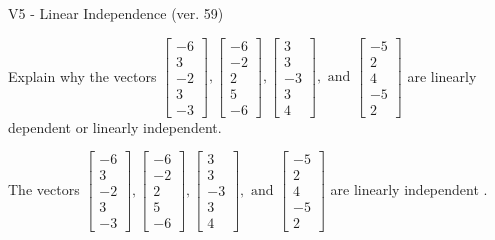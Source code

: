 \begin{exercise}
  \begin{exerciseTitle}V5 - Linear Independence (ver. 59)\end{exerciseTitle}
  \begin{exerciseStatement}
    Explain why the vectors \(\left[\begin{array}{r}
-6 \\
3 \\
-2 \\
3 \\
-3
\end{array}\right] , \left[\begin{array}{r}
-6 \\
-2 \\
2 \\
5 \\
-6
\end{array}\right] , \left[\begin{array}{r}
3 \\
3 \\
-3 \\
3 \\
4
\end{array}\right] , \text{ and } \left[\begin{array}{r}
-5 \\
2 \\
4 \\
-5 \\
2
\end{array}\right]\) are linearly dependent or linearly independent.	


  \end{exerciseStatement}
  \begin{exerciseAnswer}
   The vectors \(\left[\begin{array}{r}
-6 \\
3 \\
-2 \\
3 \\
-3
\end{array}\right] , \left[\begin{array}{r}
-6 \\
-2 \\
2 \\
5 \\
-6
\end{array}\right] , \left[\begin{array}{r}
3 \\
3 \\
-3 \\
3 \\
4
\end{array}\right] , \text{ and } \left[\begin{array}{r}
-5 \\
2 \\
4 \\
-5 \\
2
\end{array}\right]\) are 
  	 linearly independent  .
  


  \end{exerciseAnswer}
\end{exercise}